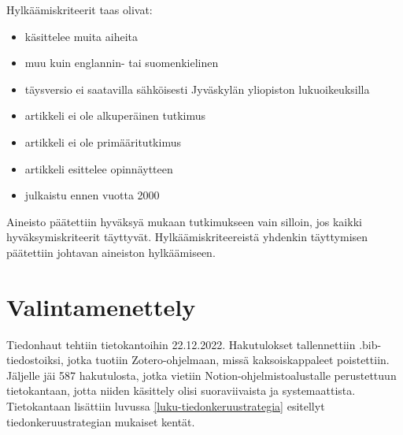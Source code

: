\documentclass[utf8]{gradu3}
\begin{document}
Hylkäämiskriteerit taas olivat:

\begin{itemize}
    \item käsittelee muita aiheita
    \item muu kuin englannin- tai suomenkielinen
    \item täysversio ei saatavilla sähköisesti Jyväskylän yliopiston lukuoikeuksilla
    \item artikkeli ei ole alkuperäinen tutkimus
    \item artikkeli ei ole primääritutkimus
    \item artikkeli esittelee opinnäytteen
    \item julkaistu ennen vuotta 2000
\end{itemize}

Aineisto päätettiin hyväksyä mukaan tutkimukseen vain silloin, jos kaikki hyväksymiskriteerit täyttyvät. Hylkäämiskriteereistä yhdenkin täyttymisen päätettiin johtavan aineiston hylkäämiseen.




\section{Valintamenettely}

Tiedonhaut tehtiin tietokantoihin 22.12.2022. Hakutulokset tallennettiin .bib-tiedostoiksi, jotka tuotiin Zotero-ohjelmaan, missä kaksoiskappaleet poistettiin. Jäljelle jäi 587 hakutulosta, jotka vietiin Notion-ohjelmistoalustalle perustettuun tietokantaan, jotta niiden käsittely olisi suoraviivaista ja systemaattista. Tietokantaan lisättiin luvussa \ref{luku-tiedonkeruustrategia} esitellyt tiedonkeruustrategian mukaiset kentät.
\end{document}
